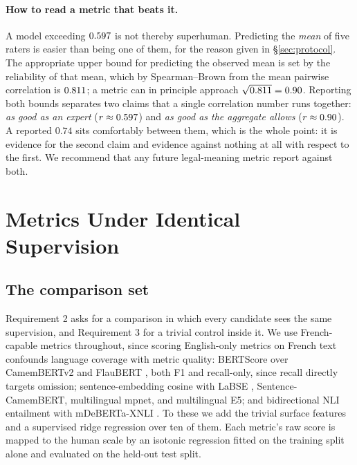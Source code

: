 \documentclass[11pt]{article}
\begin{document}
\paragraph{How to read a metric that beats it.}
A model exceeding $0.597$ is not thereby superhuman. Predicting the \emph{mean}
of five raters is easier than being one of them, for the reason given in
\S\ref{sec:protocol}. The appropriate upper bound for predicting the observed
mean is set by the reliability of that mean, which by Spearman--Brown from the
mean pairwise correlation is $0.811$; a metric can in principle approach
$\sqrt{0.811}=0.90$. Reporting both bounds separates two claims that a
single correlation number runs together: \emph{as good as an expert}
($r \approx 0.597$) and \emph{as good as the aggregate allows}
($r \approx 0.90$). A reported $0.74$ sits comfortably between them, which is
the whole point: it is evidence for the second claim and evidence against
nothing at all with respect to the first. We recommend that any future
legal-meaning metric report against both.

\section{Metrics Under Identical Supervision}
\label{sec:baselines}

\subsection{The comparison set}

Requirement 2 asks for a comparison in which every candidate sees the same
supervision, and Requirement 3 for a trivial control inside it. We use
French-capable metrics throughout, since scoring English-only metrics on French
text confounds language coverage with metric quality: BERTScore
\citep{zhang2019bertscore} over CamemBERTv2 \citep{antoun2024camembert2} and
FlauBERT \citep{le2020flaubert}, both F1 and recall-only, since recall directly
targets omission; sentence-embedding cosine with LaBSE \citep{feng2022labse},
Sentence-CamemBERT, multilingual mpnet, and multilingual E5; and bidirectional
NLI entailment with mDeBERTa-XNLI \citep{laurer2024nli}. To these we add the
trivial surface features and a supervised ridge regression over ten of them.
Each metric's raw score is mapped to the human scale by an isotonic regression
fitted on the training split alone and evaluated on the held-out test split.

\begin{table}[t]\centering\small

\caption{Calibrated comparison on the \textsc{FrJudge} test split, mean over
10 seeds. RMSE$_{\text{raw}}$ is the decimal-scaling protocol in current use;
RMSE$_{\text{cal}}$ fits an isotonic map on the training split. $r$ and $\rho$
are unaffected by calibration for the unsupervised metrics.}
\label{tab:baselines}
\end{table}
\end{document}
